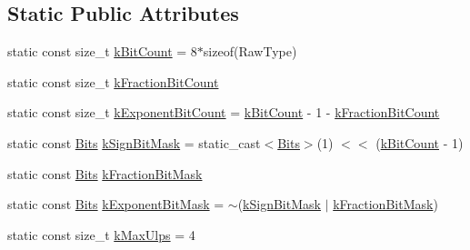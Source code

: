 \subsection*{Static Public Attributes}
\begin{DoxyCompactItemize}
\item 
static const size\+\_\+t \hyperlink{classtesting_1_1internal_1_1FloatingPoint_ab819d2e8f93e9e482373999f0f8d71b9}{k\+Bit\+Count} = 8$\ast$sizeof(Raw\+Type)
\item 
static const size\+\_\+t \hyperlink{classtesting_1_1internal_1_1FloatingPoint_a0b756a6d2a4f5f5b41ca79651c06c043}{k\+Fraction\+Bit\+Count}
\item 
static const size\+\_\+t \hyperlink{classtesting_1_1internal_1_1FloatingPoint_a1973d843c00781053d3073daa8a40119}{k\+Exponent\+Bit\+Count} = \hyperlink{classtesting_1_1internal_1_1FloatingPoint_ab819d2e8f93e9e482373999f0f8d71b9}{k\+Bit\+Count} -\/ 1 -\/ \hyperlink{classtesting_1_1internal_1_1FloatingPoint_a0b756a6d2a4f5f5b41ca79651c06c043}{k\+Fraction\+Bit\+Count}
\item 
static const \hyperlink{classtesting_1_1internal_1_1FloatingPoint_abf228bf6cd48f12c8b44c85b4971a731}{Bits} \hyperlink{classtesting_1_1internal_1_1FloatingPoint_aca98b5ea6f2222a66a82e52421682efa}{k\+Sign\+Bit\+Mask} = static\+\_\+cast$<$\hyperlink{classtesting_1_1internal_1_1FloatingPoint_abf228bf6cd48f12c8b44c85b4971a731}{Bits}$>$(1) $<$$<$ (\hyperlink{classtesting_1_1internal_1_1FloatingPoint_ab819d2e8f93e9e482373999f0f8d71b9}{k\+Bit\+Count} -\/ 1)
\item 
static const \hyperlink{classtesting_1_1internal_1_1FloatingPoint_abf228bf6cd48f12c8b44c85b4971a731}{Bits} \hyperlink{classtesting_1_1internal_1_1FloatingPoint_a0ac75d4ffd24f14bca452abe8a718da1}{k\+Fraction\+Bit\+Mask}
\item 
static const \hyperlink{classtesting_1_1internal_1_1FloatingPoint_abf228bf6cd48f12c8b44c85b4971a731}{Bits} \hyperlink{classtesting_1_1internal_1_1FloatingPoint_a66065dfc4d5f41100f686159637af23b}{k\+Exponent\+Bit\+Mask} = $\sim$(\hyperlink{classtesting_1_1internal_1_1FloatingPoint_aca98b5ea6f2222a66a82e52421682efa}{k\+Sign\+Bit\+Mask} $\vert$ \hyperlink{classtesting_1_1internal_1_1FloatingPoint_a0ac75d4ffd24f14bca452abe8a718da1}{k\+Fraction\+Bit\+Mask})
\item 
static const size\+\_\+t \hyperlink{classtesting_1_1internal_1_1FloatingPoint_aac498b3714d93f8e88cdc30e4c5935f6}{k\+Max\+Ulps} = 4
\end{DoxyCompactItemize}
